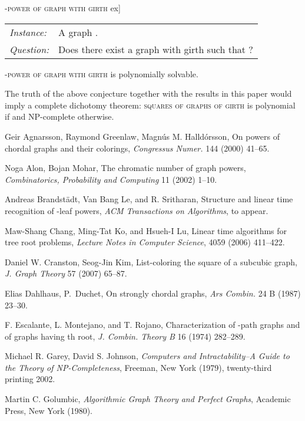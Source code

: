\documentclass[proceedings]{stacs}
\begin{document}
\begin{center}
\textsc{-power of graph with girth }\1ex]
\begin{tabular}{l l}
{\em Instance:}& A graph .\\
{\em Question:}& Does there exist a graph  with girth  such that ?\\
\end{tabular}

\begin{conjecture}\label{conj}
\textsc{-power of graph with girth } is polynomially solvable.
\end{conjecture}

The truth of the above conjecture together with the results in this paper would imply a
complete dichotomy theorem: \textsc{squares of graphs of girth } is polynomial if
 and NP-complete otherwise.


\begin{thebibliography}{99}
  Geir Agnarsson, Raymond Greenlaw, Magn\'us M. Halld\'orsson,
  On powers of chordal graphs and their colorings,
  {\sl Congressus Numer.} 144 (2000) 41--65.

  Noga Alon, Bojan Mohar,
  The chromatic number of graph powers,
  {\sl Combinatorics, Probability and Computing} 11 (2002) 1--10.

  Andreas Brandst\"adt, Van Bang Le, and R. Sritharan,
  Structure and linear time recognition of -leaf powers,
  {\sl ACM Transactions on Algorithms}, to appear.

  Maw-Shang Chang, Ming-Tat Ko, and Hsueh-I Lu,
  Linear time algorithms for tree root problems,
  {\sl Lecture Notes in Computer Science}, 4059 (2006) 411--422.

  Daniel W. Cranston, Seog-Jin Kim,
  List-coloring the square of a subcubic graph,
  {\sl J. Graph Theory} 57 (2007) 65--87.

  Elias Dahlhaus, P.~Duchet,
  On strongly chordal graphs,
  {\sl Ars Combin.} 24 B (1987) 23--30.

  F. Escalante, L. Montejano, and T. Rojano,
  Characterization of -path graphs and of graphs having th root,
  {\sl J. Combin. Theory B} 16 (1974) 282--289.

  Michael R. Garey, David S. Johnson,
  {\sl Computers and Intractability--A Guide to the Theory of NP-Completeness},
  Freeman, New York (1979), twenty-third printing 2002.

  Martin C. Golumbic,
  {\sl Algorithmic Graph Theory and Perfect Graphs},
  Academic Press, New York (1980).


\end{thebibliography}
\end{center}
\end{document}
